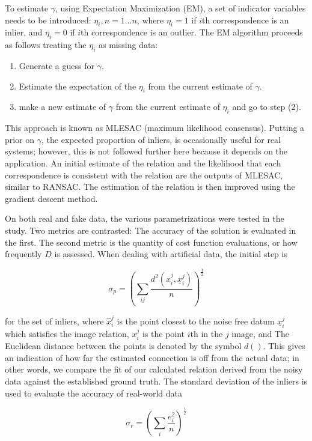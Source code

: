 \documentclass[conference]{IEEEtran}
\begin{document}
To estimate \( \gamma \), using Expectation Maximization (EM), a set of indicator variables needs to be introduced: \( \eta_i, n = 1...n \), where \( \eta_i = 1 \) if \( i \)th correspondence is an inlier, and \( \eta_i = 0 \) if \( i \)th correspondence is an outlier. The EM algorithm proceeds as follows treating the \( \eta_i \) as missing data: 

\begin{enumerate}
  \item Generate a guess for \( \gamma \).
  \item Estimate the expectation of the \( \eta_i \) from the current estimate of \( \gamma \).
  \item make a new estimate of \( \gamma \) from the current estimate of \( \eta_i \) and go to step (2).
\end{enumerate}

This approach is known as MLESAC (maximum likelihood consensus). Putting a prior on \( \gamma \), the expected proportion of inliers, is occasionally useful for real systems; however, this is not followed further here because it depends on the application. An initial estimate of the relation and the likelihood that each correspondence is consistent with the relation are the outputs of MLESAC, similar to RANSAC. The estimation of the relation is then improved using the gradient descent method.

On both real and fake data, the various parametrizations were tested in the study. Two metrics are contrasted: The accuracy of the solution is evaluated in the first. The second metric is the quantity of cost function evaluations, or how frequently \( D \) is assessed. When dealing with artificial data, the initial step is

\[ \sigma_p = (\sum_{ij} \frac{d^2(\hat{x}_i^j,\underline{x}_i^j)}{n})^\frac{1}{2} \]

for the set of inliers, where \( \hat{x}_i^j \) is the point closest to the noise free datum  \( \underline{x}_i^j \) which satisfies the image relation, \( x_i^j \) is the point \( i \)th in the \( j \) image, and The Euclidean distance between the points is denoted by the symbol \( d() \). This gives an indication of how far the estimated connection is off from the actual data; in other words, we compare the fit of our calculated relation derived from the noisy data against the established ground truth. The standard deviation of the inliers is used to evaluate the accuracy of real-world data

\[ \sigma_r = (\sum_{i} \frac{e_i^2}{n})^\frac{1}{2} \]
\end{document}
